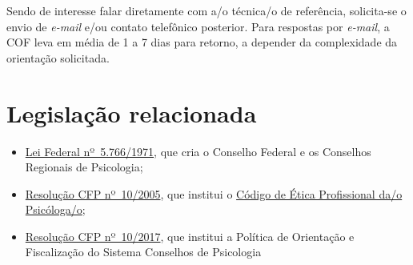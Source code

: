 Sendo de interesse falar diretamente com a/o técnica/o de referência, solicita-se o envio de \emph{e-mail} e/ou contato telefônico posterior. Para respostas por \emph{e-mail}, a COF leva em média de 1 a 7 dias para retorno, a depender da complexidade da orientação solicitada.

\section{Legislação relacionada}

\begin{itemize}
  \item  \href{http://www.planalto.gov.br/ccivil_03/leis/l5766.htm}{Lei Federal  nº~5.766/1971}, que cria o Conselho Federal e os Conselhos Regionais  de Psicologia;
  \item  \href{https://atosoficiais.com.br/cfp/resolucao-do-exercicio-profissional-n-10-2005-aprova-o-codigo-de-etica-profissional-do-psicologo}{Resolução  CFP nº~10/2005}, que institui o  \href{https://www.crpsp.org/uploads/pagina/289379/2j9LIMPLJ9jFr5YrK57HmAiBWjVMxdbe.pdf}{Código  de Ética Profissional da/o Psicóloga/o};
  \item  \href{https://transparencia.cfp.org.br/wp-content/uploads/sites/10/2017/07/Resolu\%C3\%A7\%C3\%A3o-CFP-010-2017-Politica-de-Orienta\%C3\%A7\%C3\%A3o-e-Fiscaliza\%C3\%A7\%C3\%A3o-dos-Conselhos.pdf}{Resolução  CFP nº~10/2017}, que institui a Política de Orientação e Fiscalização  do Sistema Conselhos de Psicologia
\end{itemize}

\sumario